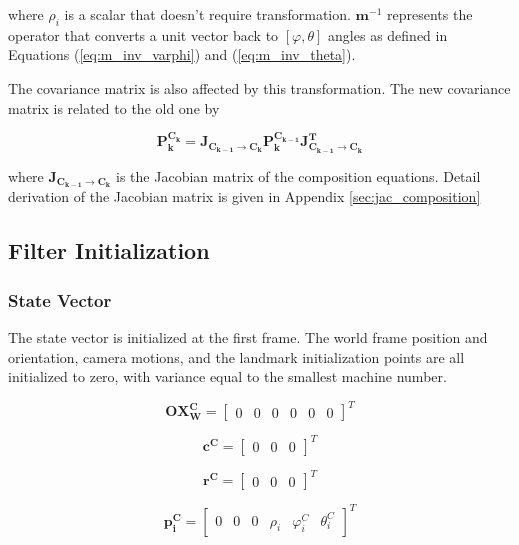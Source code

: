 \noindent where $\rho_i$ is a scalar that doesn't require transformation.
$\boldsymbol{m}^{-1}$ represents the operator that converts
a unit vector back to $[\varphi, \theta]$ angles as defined in
Equations (\ref{eq:m_inv_varphi}) and (\ref{eq:m_inv_theta}).

The covariance matrix is also affected by this transformation. The new
covariance matrix is related to the old one by

\begin{equation}
\boldsymbol{P_{k}^{C_{k}}}=\boldsymbol{J_{C_{k-1}\to C_{k}}}\boldsymbol{P_{k}^{C_{k-1}}}\boldsymbol{J_{C_{k-1}\to C_{k}}^{T}}
\end{equation}

\noindent where $\boldsymbol{J_{C_{k-1} \to C_k}}$ is the Jacobian matrix of the
composition equations. Detail derivation of the Jacobian matrix is
given in Appendix \ref{sec:jac_composition}  

\subsection{Filter Initialization} \label{sec:filter_initialization}
\subsubsection{State Vector}

The state vector is initialized at the first frame. The world frame
position and orientation, camera motions, and the landmark
initialization points are all initialized to zero, with variance
equal to the smallest machine number.

\begin{equation}
\label{eq:OX_init}
\boldsymbol{OX_{W}^{C}}=\begin{bmatrix}0&0&0&0&0&0\end{bmatrix}^T 
\end{equation}

\begin{equation}
\boldsymbol{c^{C}}=\begin{bmatrix}0&0&0\end{bmatrix}^T
\end{equation}

\begin{equation}
\boldsymbol{r^{C}}=\begin{bmatrix}0&0&0\end{bmatrix}^T
\end{equation}

\begin{equation}
\label{eq:pi_init}
\boldsymbol{p_{i}^{C}}=\begin{bmatrix}0&0&0&\rho _{i}&\varphi_{i}^C&\theta_{i}^C\end{bmatrix}^T
\end{equation}

